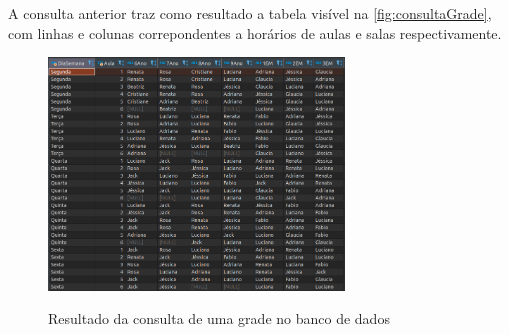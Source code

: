 A consulta anterior traz como resultado a tabela visível na \autoref{fig:consultaGrade}, com linhas e colunas correpondentes a horários de aulas e salas respectivamente.

\begin{figure}[!htb]
	\centering
	\caption{Resultado da consulta de uma grade no banco de dados}
	\includegraphics[width=0.7\textwidth]{./dados/figuras/ConsultaGrade}
	\label{fig:consultaGrade}
\end{figure}